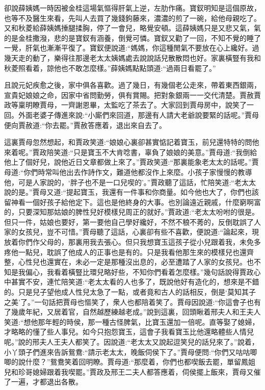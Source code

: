 


\begin{parag}
    卻說薛姨媽一時因被金桂這場氣慪得肝氣上逆，左肋作痛。寶釵明知是這個原故，也等不及醫生來看，先叫人去買了幾錢鉤藤來，濃濃的煎了一碗，給他母親吃了。又和秋菱給薛姨媽捶腿揉胸，停了一會兒，略覺安頓。這薛姨媽只是又悲又氣，氣的是金桂撒潑，悲的是寶釵有涵養，倒覺可憐。寶釵又勸了一回，不知不覺的睡了一覺，肝氣也漸漸平復了。寶釵便說道:“媽媽，你這種閒氣不要放在心上纔好。過幾天走的動了，樂得往那邊老太太姨媽處去說說話兒散散悶也好。家裏橫豎有我和秋菱照看着，諒他也不敢怎麼樣。”薛姨媽點點頭道:“過兩日看罷了。”
\end{parag}


\begin{parag}
    且說元妃疾愈之後，家中俱各喜歡。過了幾日，有幾個老公走來，帶着東西銀兩，宣貴妃娘娘之命，因家中省問勤勞，俱有賞賜。把對象銀兩一一交代清楚。賈赦賈政等稟明瞭賈母，一齊謝恩畢，太監吃了茶去了。大家回到賈母房中，說笑了一回。外面老婆子傳進來說:“小廝們來回道，那邊有人請大老爺說要緊的話呢。”賈母便向賈赦道:“你去罷。”賈赦答應着，退出來自去了。
\end{parag}


\begin{parag}
    這裏賈母忽然想起，和賈政笑道:“娘娘心裏卻甚實惦記着寶玉，前兒還特特的問他來着呢。”賈政陪笑道:“只是寶玉不大肯唸書，辜負了娘娘的美意。”賈母道:“我倒給他上了個好兒，說他近日文章都做上來了。”賈政笑道:“那裏能象老太太的話呢。”賈母道:“你們時常叫他出去作詩作文，難道他都沒作上來麼。小孩子家慢慢的教導他，可是人家說的，‘胖子也不是一口兒喫的’。”賈政聽了這話，忙陪笑道:“老太太說的是。”賈母又道:“提起寶玉，我還有一件事和你商量。如今他也大了，你們也該留神看一個好孩子給他定下。這也是他終身的大事。也別論遠近親戚，什麼窮啊富的，只要深知那姑娘的脾性兒好模樣兒周正的就好。”賈政道:“老太太吩咐的很是。但只一件，姑娘也要好，第一要他自己學好纔好，不然不稂不莠的，反倒耽誤了人家的女孩兒，豈不可惜。”賈母聽了這話，心裏卻有些不喜歡，便說道:“論起來，現放着你們作父母的，那裏用我去張心。但只我想寶玉這孩子從小兒跟着我，未免多疼他一點兒，耽誤了他成人的正事也是有的。只是我看他那生來的模樣兒也還齊整，心性兒也還實在，未必一定是那種沒出息的，必至遭踏了人家的女孩兒。也不知是我偏心，我看着橫豎比環兒略好些，不知你們看着怎麼樣。”幾句話說得賈政心中甚實不安，連忙陪笑道:“老太太看的人也多了，既說他好有造化的，想來是不錯的。只是兒子望他成人性兒太急了一點，或者竟和古人的話相反，倒是‘莫知其子之美’了。”一句話把賈母也慪笑了，衆人也都陪着笑了。賈母因說道:“你這會子也有了幾歲年紀，又居着官，自然越歷練越老成。”說到這裏，回頭瞅着邢夫人和王夫人笑道:“想他那年輕的時侯，那一種古怪脾氣，比寶玉還加一倍呢。直等娶了媳婦，才略略的懂了些人事兒。如今只抱怨寶玉，這會子我看寶玉比他還略體些人情兒呢。”說的邢夫人王夫人都笑了。因說道:“老太太又說起逗笑兒的話兒來了。”說着，小丫頭子們進來告訴鴛鴦:“請示老太太，晚飯伺侯下了。”賈母便問:“你們又咕咕唧唧的說什麼？”鴛鴦笑着回明瞭。賈母道:“那麼着，你們也都喫飯去罷，單留鳳姐兒和珍哥媳婦跟着我喫罷。”賈政及邢王二夫人都答應着，伺侯擺上飯來，賈母又催了一遍，才都退出各散。
\end{parag}



